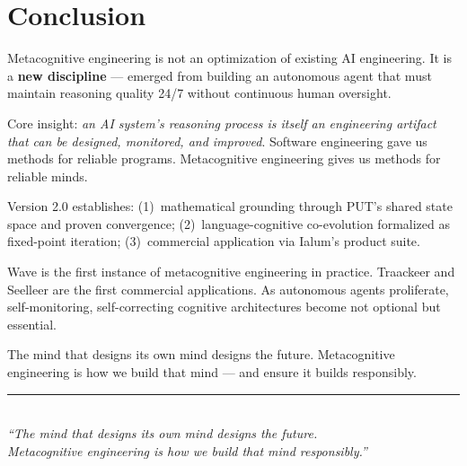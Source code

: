 \documentclass[12pt,a4paper]{article}
\theoremstyle{plain}
\theoremstyle{definition}
\theoremstyle{remark}
\begin{document}
\section{Conclusion}

Metacognitive engineering is not an optimization of existing AI engineering. It is a \textbf{new discipline} --- emerged from building an autonomous agent that must maintain reasoning quality 24/7 without continuous human oversight.

Core insight: \emph{an AI system's reasoning process is itself an engineering artifact that can be designed, monitored, and improved}. Software engineering gave us methods for reliable programs. Metacognitive engineering gives us methods for reliable minds.

Version 2.0 establishes: (1)~mathematical grounding through PUT's shared state space and proven convergence; (2)~language-cognitive co-evolution formalized as fixed-point iteration; (3)~commercial application via Ialum's product suite.

Wave is the first instance of metacognitive engineering in practice. Traackeer and Seelleer are the first commercial applications. As autonomous agents proliferate, self-monitoring, self-correcting cognitive architectures become not optional but essential.

The mind that designs its own mind designs the future. Metacognitive engineering is how we build that mind --- and ensure it builds responsibly.

\vspace{2em}
\begin{center}
\rule{0.6\textwidth}{0.4pt}\\[1.5em]
\textit{``The mind that designs its own mind designs the future.\\
Metacognitive engineering is how we build that mind responsibly.''}
\end{center}
\end{document}
